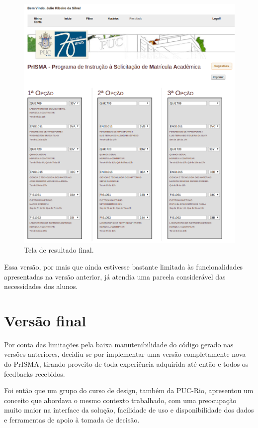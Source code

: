 \documentclass[graduacao,brazil]{ThesisPUC}
\begin{document}
\begin{figure}[H]
    \centering
    \includegraphics[width=\linewidth]{img/v2_final.png}
    \caption{Tela de resultado final.}
\end{figure}

Essa versão, por mais que ainda estivesse bastante limitada às funcionalidades apresentadas na versão anterior, já atendia uma parcela considerável das necessidades dos alunos.


\section{Versão final}

Por conta das limitações pela baixa manutenibilidade do código gerado nas versões anteriores, decidiu-se por implementar uma versão completamente nova do PrISMA, tirando proveito de toda experiência adquirida até então e todos os feedbacks recebidos.

Foi então que um grupo do curso de design, também da PUC-Rio, apresentou um conceito que abordava o mesmo contexto trabalhado, com uma preocupação muito maior na interface da solução, facilidade de uso e disponibilidade dos dados e ferramentas de apoio à tomada de decisão.
\end{document}
